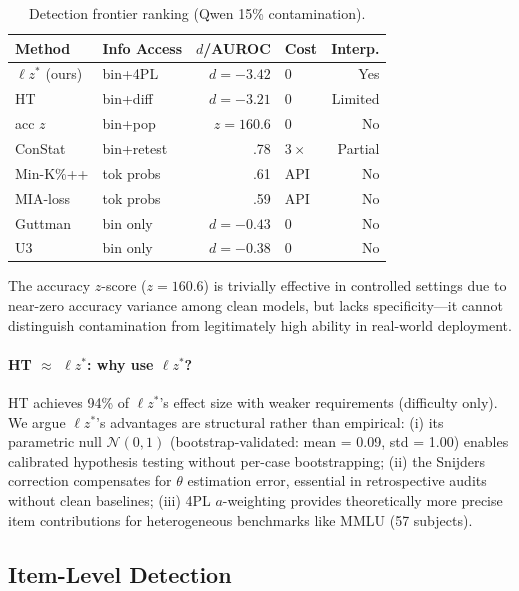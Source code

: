\documentclass[11pt,twocolumn]{article}
\newcommand{\lzs}{\ensuremath{\ell z^*}}
\begin{document}
\begin{table}[t]
\centering
\caption{Detection frontier ranking (Qwen 15\% contamination).}
\label{tab:frontier}
\footnotesize
\begin{tabular}{llrlr}
\toprule
Method & Info Access & $d$/AUROC & Cost & Interp. \\
\midrule
$\lzs$ (ours) & bin+4PL & $d{=}{-}3.42$ & 0 & Yes \\
HT & bin+diff & $d{=}{-}3.21$ & 0 & Limited \\
acc $z$ & bin+pop & $z{=}160.6$ & 0 & No \\
ConStat & bin+retest & .78 & $3\times$ & Partial \\
Min-K\%++ & tok probs & .61 & API & No \\
MIA-loss & tok probs & .59 & API & No \\
Guttman & bin only & $d{=}{-}0.43$ & 0 & No \\
U3 & bin only & $d{=}{-}0.38$ & 0 & No \\
\bottomrule
\end{tabular}
\vspace{-0.3cm}
\end{table}

The accuracy $z$-score ($z = 160.6$) is trivially effective in controlled settings due to near-zero accuracy variance among clean models, but lacks specificity---it cannot distinguish contamination from legitimately high ability in real-world deployment.

\paragraph{HT $\approx$ $\lzs$: why use $\lzs$?}
HT achieves 94\% of $\lzs$'s effect size with weaker requirements (difficulty only). We argue $\lzs$'s advantages are structural rather than empirical: (i) its parametric null $\mathcal{N}(0,1)$ (bootstrap-validated: mean = 0.09, std = 1.00) enables calibrated hypothesis testing without per-case bootstrapping; (ii) the Snijders correction compensates for $\theta$ estimation error, essential in retrospective audits without clean baselines; (iii) 4PL $a$-weighting provides theoretically more precise item contributions for heterogeneous benchmarks like MMLU (57 subjects).

\subsection{Item-Level Detection}
\end{document}

